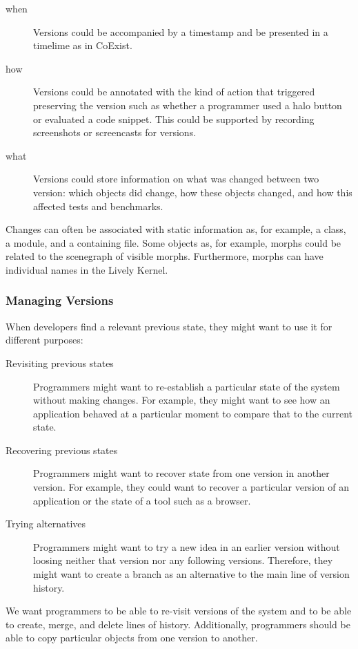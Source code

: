 \begin{description}
    \item[when] Versions could be accompanied by a timestamp and be presented in a timelime as in CoExist.
    \item[how] Versions could be annotated with the kind of action that triggered preserving the version such as whether a programmer used a halo button or evaluated a code snippet. This could be supported by recording screenshots or screencasts for versions.
    \item[what] Versions could store information on what was changed between two version: which objects did change, how these objects changed, and how this affected tests and benchmarks.
\end{description}

Changes can often be associated with static information as, for example, a class, a module, and a containing file.
Some objects as, for example, morphs could be related to the scenegraph of visible morphs.
Furthermore, morphs can have individual names in the Lively Kernel.

\subsubsection{Managing Versions}

When developers find a relevant previous state, they might want to use it for different purposes:

\begin{description}
    \item[Revisiting previous states] Programmers might want to re-establish a particular state of the system without making changes. For example, they might want to see how an application behaved at a particular moment to compare that to the current state.
    \item[Recovering previous states] Programmers might want to recover state from one version in another version. For example, they could want to recover a particular version of an application or the state of a tool such as a browser.
    \item[Trying alternatives] Programmers might want to try a new idea in an earlier version without loosing neither that version nor any following versions. Therefore, they might want to create a branch as an alternative to the main line of version history.
\end{description}

We want programmers to be able to re-visit versions of the system and to be able to create, merge, and delete lines of history.
Additionally, programmers should be able to copy particular objects from one version to another.
